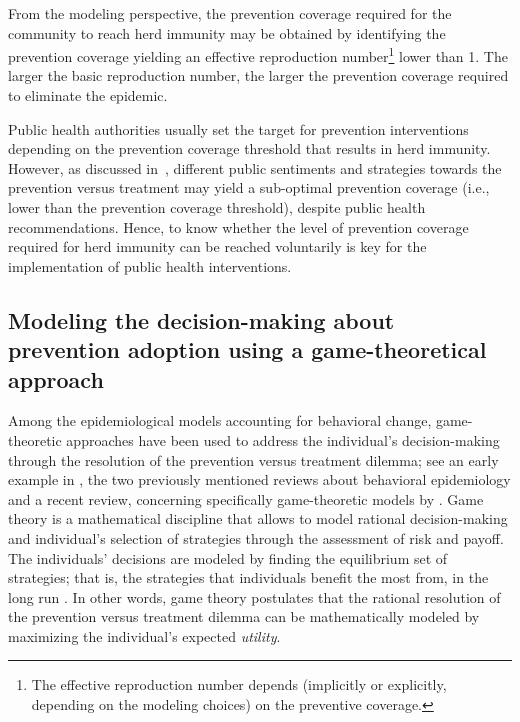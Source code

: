 From the modeling perspective, the prevention coverage required for the community to reach herd immunity may be obtained by identifying the prevention coverage yielding an effective reproduction number\footnote{The effective reproduction number depends (implicitly or explicitly, depending on the modeling choices) on the preventive coverage.} lower than 1. The larger the basic reproduction number, the larger the prevention coverage required to eliminate the epidemic. 

Public health authorities usually set the target for prevention interventions depending on the prevention coverage threshold that results in herd immunity. However, as discussed in~, different public sentiments and strategies towards the prevention versus treatment may yield a sub-optimal prevention coverage (i.e., lower than the prevention coverage threshold), despite public health recommendations. Hence, to know whether the level of prevention coverage required for herd immunity can be reached voluntarily is key for the implementation of public health interventions. 


\subsection{Modeling the decision-making about prevention adoption using a game-theoretical approach}
\label{Intro:DecisionModel}

Among the epidemiological models accounting for behavioral change, game-theoretic approaches have been used to address the individual's decision-making through the resolution of the prevention versus treatment dilemma; see an early example in \cite[]{Bauch2013}, the two previously mentioned reviews about behavioral epidemiology \cite{Verelst2016,Wang2016} and a recent review, concerning specifically game-theoretic models by \cite{Chang2020}. Game theory is a mathematical discipline that allows to model rational decision-making and individual's selection of strategies through the assessment of risk and payoff. The individuals' decisions are modeled by finding the equilibrium set of strategies; that is, the strategies that individuals benefit the most from, in the long run \cite[]{Manfredi2013}. In other words, game theory postulates that the rational resolution of the prevention versus treatment dilemma can be mathematically modeled by maximizing the individual's expected {\it utility}. 

